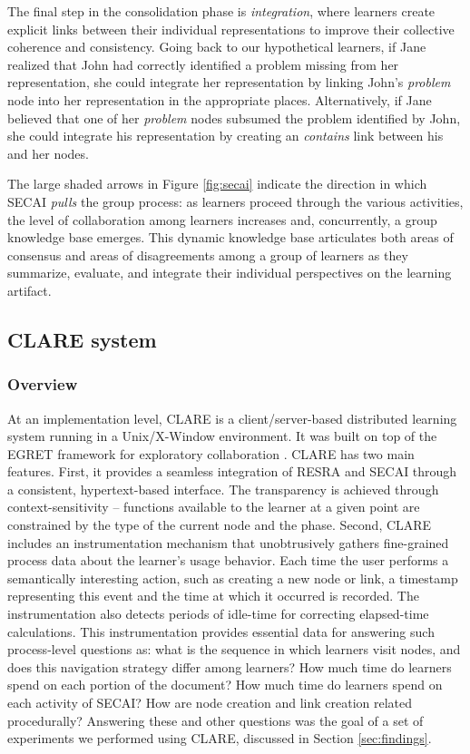 The final step in the consolidation phase is {\it integration\/}, where
learners create explicit links between their individual representations to
improve their collective coherence and consistency. Going back to our
hypothetical learners, if Jane realized that John had correctly identified
a problem missing from her representation, she could integrate her
representation by linking John's {\em problem} node into her representation
in the appropriate places.  Alternatively, if Jane believed that one of her
{\em problem} nodes subsumed the problem identified by John, she could
integrate his representation by creating an {\em contains} link between
his and her nodes.

The large shaded arrows in Figure \ref{fig:secai} indicate the direction in
which SECAI {\it pulls} the group process: as learners proceed through
the various activities, the level of collaboration among learners increases
and, concurrently, a group knowledge base emerges.  This dynamic knowledge
base articulates both areas of consensus and areas of disagreements among a
group of learners as they summarize, evaluate, and integrate their
individual perspectives on the learning artifact.


\subsection{CLARE system}
\label{sec:clare}

\subsubsection{Overview}

At an implementation level, CLARE is a client/server-based distributed
learning system running in a Unix/X-Window environment. It was built on top
of the EGRET framework for exploratory collaboration
\cite{csdl-92-01,csdl-93-09}. CLARE has two main features. First, it
provides a seamless integration of RESRA and SECAI through a consistent,
hypertext-based interface. The transparency is achieved through
context-sensitivity -- functions available to the learner at a given point
are constrained by the type of the current node and the phase.  Second,
CLARE includes an instrumentation mechanism that unobtrusively gathers
fine-grained process data about the learner's usage behavior. Each time the
user performs a semantically interesting action, such as creating a new
node or link, a timestamp representing this event and the time at which it
occurred is recorded. The instrumentation also detects periods of idle-time
for correcting elapsed-time calculations.  This instrumentation provides
essential data for answering such process-level questions as: what is the
sequence in which learners visit nodes, and does this navigation strategy
differ among learners? How much time do learners spend on each portion of
the document?  How much time do learners spend on each activity of SECAI?
How are node creation and link creation related procedurally?
Answering these and other questions was the goal of a set of experiments we
performed using CLARE, discussed in Section \ref{sec:findings}.


